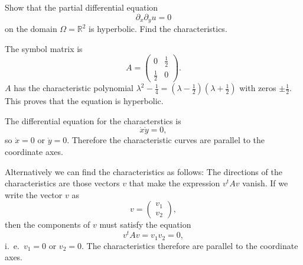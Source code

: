 Show that the partial differential equation
\[
\partial_x\partial_y u=0
\]
on the domain $\Omega=\mathbb R^2$ is hyperbolic.
Find the characteristics.

\begin{loesung}
The symbol matrix is
\[
A=\begin{pmatrix}0&\frac12\\\frac12&0\end{pmatrix}.
\]
$A$ has the characteristic polynomial
$\lambda^2-\frac14=(\lambda-\frac12)(\lambda+\frac12)$
with zeros
$\pm\frac12$.
This proves that the equation is hyperbolic.

The differential equation for the characterstics is
\[
\dot x\dot y=0,
\]
so $\dot x=0$ or $\dot y=0$.
Therefore the characteristic curves are parallel to the coordinate
axes.

Alternatively we can find the characteristics as follows:
The directions of the characteristics are those vectors $v$ that make
the expression $v^tAv$ vanish.
If we write the vector $v$ as
\[
v=\begin{pmatrix}v_1\\v_2\end{pmatrix},
\]
then the components of $v$ must satisfy the equation
\[
v^tAv=v_1v_2=0,
\]
i.~e.~$v_1=0$ or $v_2=0$.
The characteristics therefore are parallel to the coordinate axes.
\end{loesung}
